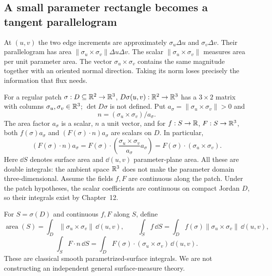 \subsection{A small parameter rectangle becomes a tangent parallelogram}
At $(u,v)$ the two edge increments are approximately
$\sigma_u\Delta u$ and $\sigma_v\Delta v$. Their parallelogram has area
$\|\sigma_u\times\sigma_v\|\Delta u\Delta v$.
The scalar $\|\sigma_u\times\sigma_v\|$ measures area per unit parameter
area. The vector $\sigma_u\times\sigma_v$ contains the same magnitude
together with an oriented normal direction. Taking its norm loses precisely
the information that flux needs.

For a regular patch $\sigma:D\subseteq\mathbb{R}^2\to\mathbb{R}^3$,
$D\sigma(u,v):\mathbb{R}^2\to\mathbb{R}^3$ has a $3\times2$ matrix with columns
$\sigma_u,\sigma_v\in\mathbb{R}^3$; $\det D\sigma$ is not defined. Put $a_\sigma=\|\sigma_u\times\sigma_v\|>0$
and
\[
n=(\sigma_u\times\sigma_v)/a_\sigma.
\]
 The area factor $a_\sigma$ is
a scalar, $n$ a unit vector, and for $f:S\to\mathbb{R}$, $F:S\to\mathbb{R}^3$,
both $f(\sigma)a_\sigma$ and $(F(\sigma)\cdot n)a_\sigma$ are scalars on $D$.
In particular,
\[
(F(\sigma)\cdot n)a_\sigma
=F(\sigma)\cdot\left(\frac{\sigma_u\times\sigma_v}{a_\sigma}a_\sigma\right)
=F(\sigma)\cdot(\sigma_u\times\sigma_v).
\]
Here $\dd S$ denotes surface area and $\dd(u,v)$ parameter-plane area.
All these are double integrals: the ambient space $\mathbb{R}^3$ does not make
the parameter domain three-dimensional. Assume the fields $f,F$ are
continuous along the patch. Under the patch hypotheses,
the scalar coefficients are continuous on compact Jordan $D$, so their
integrals exist by Chapter~12.


\begin{definition}
For $S=\sigma(D)$ and continuous $f,F$ along $S$, define
\[
\operatorname{area}(S)=\int_D\|\sigma_u\times\sigma_v\|\,\dd(u,v),
\qquad
\int_S f\,\dd S=\int_D f(\sigma)\|\sigma_u\times\sigma_v\|\,\dd(u,v),
\]
\[
\int_S F\cdot n\,\dd S=\int_D F(\sigma)\cdot(\sigma_u\times\sigma_v)\,\dd(u,v).
\]
These are classical smooth parametrized-surface integrals. We are not
constructing an independent general surface-measure theory.
\end{definition}

